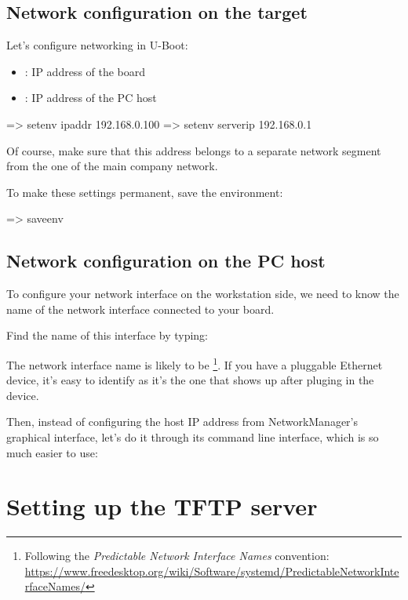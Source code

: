 \subsection{Network configuration on the target}

Let's configure networking in U-Boot:

\begin{itemize}
\item {}: IP address of the board
\item {}: IP address of the PC host
\end{itemize}

\begin{ubootinput}
=> setenv ipaddr 192.168.0.100
=> setenv serverip 192.168.0.1
\end{ubootinput}

Of course, make sure that this address belongs to a separate network
segment from the one of the main company network.

To make these settings permanent, save the environment:

\begin{ubootinput}
=> saveenv
\end{ubootinput}

\subsection{Network configuration on the PC host}

To configure your network interface on the workstation side, we need
to know the name of the network interface connected to your board.

Find the name of this interface by typing:

The network interface name is likely to be
\footnote{Following the {\em Predictable Network Interface
Names} convention:
\url{https://www.freedesktop.org/wiki/Software/systemd/PredictableNetworkInterfaceNames/}}.
If you have a pluggable Ethernet device, it's easy to identify as it's
the one that shows up after pluging in the device.

Then, instead of configuring the host IP address from NetworkManager's
graphical interface, let's do it through its command line interface,
which is so much easier to use:


\section{Setting up the TFTP server}

